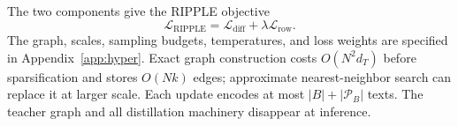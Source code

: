 The two components give the RIPPLE objective
\begin{equation}
\label{eq:full-objective}
\mathcal L_{\mathrm{RIPPLE}}
=\mathcal L_{\mathrm{diff}}+\lambda\mathcal L_{\mathrm{row}}.
\end{equation}
The graph, scales, sampling budgets, temperatures, and loss weights are specified in Appendix~\ref{app:hyper}. Exact graph construction costs $O(N^2d_T)$ before sparsification and stores $O(Nk)$ edges; approximate nearest-neighbor search can replace it at larger scale. Each update encodes at most $|B|+|\mathcal P_B|$ texts. The teacher graph and all distillation machinery disappear at inference.
